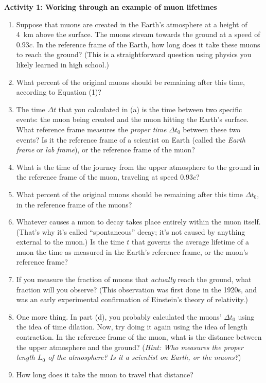 \bigskip

\textbf{Activity 1: Working through an example of muon lifetimes} 

\begin{enumerate}[labparts]
\item   
Suppose that muons are created in the Earth's atmosphere at a height of 4~km above the surface.  The muons stream towards the ground at a speed of $0.93c$.
In the reference frame of the Earth, how long does it take these muons to reach the ground?
(This is a straightforward question using physics you likely learned in high school.)
\answerspace{0.9in}

\item What percent of the original muons should be remaining after this time, according to Equation (1)? 
\answerspace{0.7in}

\item The time $\Delta t$ that you calculated in (a) is the time between two specific events: the muon being created and the muon hitting the Earth's surface.  What reference frame measures the \textit{proper time} $\Delta t_0$ between these two events?  Is it the reference frame of a scientist on Earth (called the \textit{Earth frame} or \textit{lab frame}), or the reference frame of the muon?
\answerspace{0.7in}

\item What is the time of the journey from the upper atmosphere to the ground in the reference frame of the muon, traveling at speed $0.93c$?
\answerspace{0.8in}

\item What percent of the original muons should be remaining after this time $\Delta t_0$, in the reference frame of the muons?
\answerspace{0.6in}

\item Whatever causes a muon to decay takes place entirely within the muon itself.  (That's why it's called ``spontaneous'' decay; it's not caused by anything external to the muon.)  
Is the time $t$ that governs the average lifetime of a muon the time as measured in the Earth's reference frame, or the muon's reference frame?  
\answerspace{0.5in}

\item If you measure the fraction of muons that \textit{actually} reach the ground, what fraction will you observe?
(This observation was first done in the 1920s, and was an early experimental confirmation of Einstein's theory of relativity.)
\answerspace{0.5in}

\item One more thing.  In part (d), you probably calculated the muons' $\Delta t_0$ using the idea of time dilation.  Now, try doing it again using the idea of length contraction.  In the reference frame of the muon, what is the distance between the upper atmosphere and the ground?  (\textit{Hint: Who measures the proper length $L_0$ of the atmosphere?  Is it a scientist on Earth, or the muons?})
\answerspace{0.7in}

\item How long does it take the muon to travel that distance?
\answerspace{0.6in}

\end{enumerate}
\bigskip

